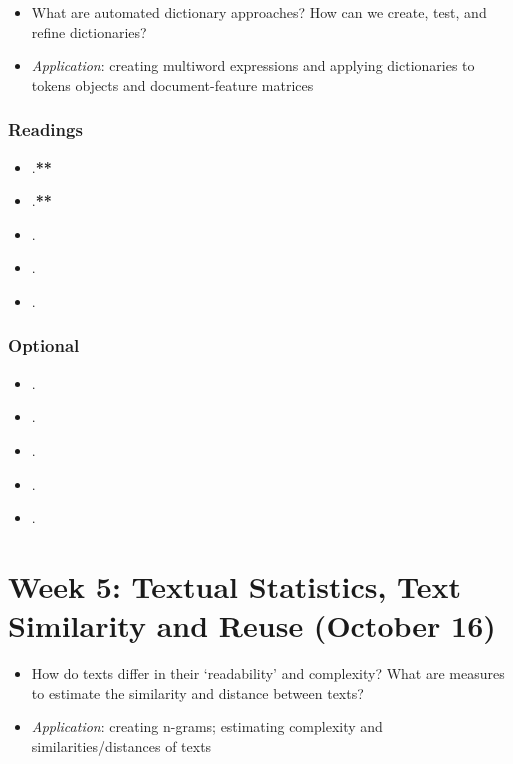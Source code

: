 \documentclass[abstract=on,parskip=full,headings=standardclasses,fontsize=11pt,paper=a4]{scrartcl}
\begin{document}
\begin{itemize}
\renewcommand\labelitemi{--}
\item What are automated dictionary approaches? How can we create, test, and refine dictionaries?
\item \textit{Application}: creating multiword expressions and applying dictionaries to tokens objects and document-feature matrices
\end{itemize}

\subsubsection*{Readings}
\begin{itemize}
\item {}.\textbf{**}
\item {}.\textbf{**}
\item {}.
\item {}.
\item {}.
\end{itemize}

\subsubsection*{Optional}
\begin{itemize}
\item {}.
\item {}.
\item {}.
\item {}.
\item {}.
\end{itemize}

\section{Week 5: Textual Statistics, Text Similarity and Reuse (October 16)}

\begin{itemize}
\renewcommand\labelitemi{--}
\item How do texts differ in their `readability' and complexity? What are measures to estimate the similarity and distance between texts?
\item \textit{Application}: creating n-grams; estimating complexity and similarities/distances of texts
\end{itemize}
\end{document}
